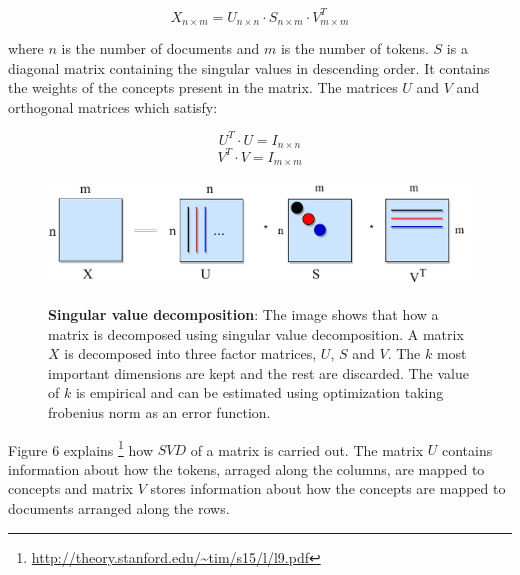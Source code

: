     \begin{equation}
    X_{n \times m} = U_{n \times n} \cdot S_{n \times m} \cdot V_{m \times m}^T
    \end{equation}
    
    where $n$ is the number of documents and $m$ is the number of tokens. $S$ is a diagonal matrix containing the singular values in descending order. It contains the weights of the concepts present in the matrix. The matrices $U$ and $V$ and orthogonal matrices which satisfy:
    
    \begin{equation}
    U^T \cdot U = I_{n \times n}
    \end{equation}
    \begin{equation}
    V^T \cdot V = I_{m \times m}
    \end{equation}
    
\begin{figure}[h]
\begin{centering}
    {\includegraphics[scale=0.7]{figures/usv.pdf}}
    \caption[Pictorial representation of SVD]{\textbf{Singular value decomposition}: The image shows that how a matrix is decomposed using singular value decomposition. A matrix $X$ is decomposed into three factor matrices, $U$, $S$ and $V$. The $k$ most important dimensions are kept and the rest are discarded. The value of $k$ is empirical and can be estimated using optimization taking frobenius norm as an error function.}
\end{centering}
\end{figure}

Figure 6 explains \footnote{\url{http://theory.stanford.edu/~tim/s15/l/l9.pdf}} how $SVD$ of a matrix is carried out. The matrix $U$ contains information about how the tokens, arraged along the columns, are mapped to concepts and matrix $V$ stores information about how the concepts are mapped to documents arranged along the rows. 


